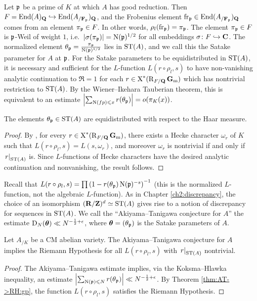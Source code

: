 Let $\mathfrak{p}$ be a prime of $K$ at which $A$ has good reduction. Then 
$F = \operatorname{End}(A)_{\mathbf{Q}}\hookrightarrow \operatorname{End}(A_{/\mathbf{F}_{\mathfrak{p}}})_{\mathbf{Q}}$, and the Frobenius 
element $\mathrm{fr}_{\mathfrak{p}}\in \operatorname{End}(A_{/\mathbf{F}_{\mathfrak{p}}})_{\mathbf{Q}}$ comes from an element 
$\pi_{\mathfrak{p}}\in F$. In other words, $\rho_l(\mathrm{fr}_{\mathfrak{p}}) = \pi_{\mathfrak{p}}$. The element 
$\pi_{\mathfrak{p}}\in F$ is $\mathfrak{p}$-Weil of weight $1$, 
i.e.~$|\sigma(\pi_{\mathfrak{p}})| = \operatorname{N}(\mathfrak{p})^{1/2}$ for all embeddings 
$\sigma\colon F\hookrightarrow \mathbf{C}$. The normalized element 
$\theta_{\mathfrak{p}} = \frac{\pi_{\mathfrak{p}}}{\operatorname{N}(\mathfrak{p})^{1/2}}$ lies in $\mathrm{ST}(A)$, and we call this 
the Satake parameter for $A$ at $\mathfrak{p}$. For the Satake parameters to be 
equidistributed in $\mathrm{ST}(A)$, it is necessary and sufficient for the 
$L$-function $L(r\circ \rho_l,s)$ to have non-vanishing analytic continuation 
to $\Re =1$ for each $r\in \operatorname{X}^\ast(\operatorname{R}_{F/\mathbf{Q}}\mathbf{G}_\mathrm{m})$ which has nontrivial 
restriction to $\mathrm{ST}(A)$. By the Wiener--Ikehara Tauberian theorem, this is 
equivalent to an estimate 
$\left| \sum_{\operatorname{N}(fp)\leqslant x} r(\theta_{\mathfrak{p}})\right| = o(\pi_K(x))$. 

\begin{theorem}
The elements $\theta_{\mathfrak{p}}\in \mathrm{ST}(A)$ are equidistributed with respect to the 
Haar measure. 
\end{theorem}
\begin{proof}
By \cite[Th.~10, 11]{serre-tate-1968}, for every 
$r\in \operatorname{X}^\ast(\operatorname{R}_{F/\mathbf{Q}}\mathbf{G}_\mathrm{m})$, there exists a Hecke character $\omega_r$ of $K$ 
such that $L(r\circ \rho_l,s) = L(s,\omega_r)$, and moreover $\omega_r$ is 
nontrivial if and only if $\left.r\right|_{\mathrm{ST}(A)}$ is. Since $L$-functions of 
Hecke characters have the desired analytic continuation and nonvanishing, the 
result follows. 
\end{proof}

Recall that 
$L(r\circ \rho_l,s) = \prod \left(1 - r(\theta_{\mathfrak{p}}) \operatorname{N}(\mathfrak{p})^{-s}\right)^{-1}$ 
(this is the normalized $L$-function, not the algebraic $L$-function). 
As in Chapter \ref{ch2:discrepancy}, the choice of an isomorphism
$(\mathbf{R}/\mathbf{Z})^d\simeq \mathrm{ST}(A)$ gives rise to a notion of discrepancy 
for sequences in $\mathrm{ST}(A)$. We call the ``Akiyama--Tanigawa conjecture for $A$'' 
the estimate $\operatorname{D}_N({\boldsymbol\theta}) \ll N^{-\frac 1 2+\epsilon}$, where 
${\boldsymbol\theta} = (\theta_{\mathfrak{p}})$ is the Satake parameters of $A$. 

\begin{theorem}\label{AT->RH:AB}
Let $A_{/K}$ be a CM abelian variety. The Akiyama--Tanigawa conjecture for $A$ 
implies the Riemann Hypothesis for all $L(r\circ \rho_l,s)$ with 
$\left. r\right|_{\mathrm{ST}(A)}$ nontrivial. 
\end{theorem}
\begin{proof}
The Akiyama--Tanigawa estimate implies, via the Koksma--Hlawka inequality, an 
estimate 
$\left| \sum_{\operatorname{N}(\mathfrak{p})\leqslant N} r(\theta_{\mathfrak{p}})\right| \ll N^{-\frac 1 2+\epsilon}$. 
By Theorem \ref{thm:AT->RH:gp}, the function $L(r\circ \rho_l,s)$ satisfies 
the Riemann Hypothesis. 
\end{proof}

